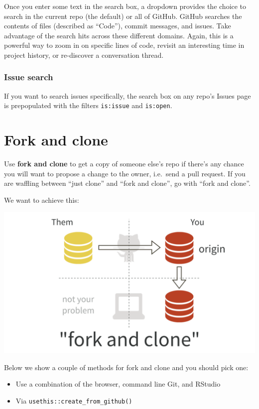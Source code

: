 \documentclass[
]{book}
\providecommand{\tightlist}{%
  \setlength{\itemsep}{0pt}\setlength{\parskip}{0pt}}
\begin{document}
Once you enter some text in the search box, a dropdown provides the choice to search in the current repo (the default) or all of GitHub. GitHub searches the contents of files (described as ``Code''), commit messages, and issues. Take advantage of the search hits across these different domains. Again, this is a powerful way to zoom in on specific lines of code, revisit an interesting time in project history, or re-discover a conversation thread.

\subsection{Issue search}\label{issue-search}

If you want to search issues specifically, the search box on any repo's Issues page is prepopulated with the filters \texttt{is:issue} and \texttt{is:open}.

\chapter{Fork and clone}\label{fork-and-clone}

Use \textbf{fork and clone} to get a copy of someone else's repo if there's any chance you will want to propose a change to the owner, i.e.~send a pull request.
If you are waffling between ``just clone'' and ``fork and clone'', go with ``fork and clone''.

We want to achieve this:

\begin{center}\includegraphics[width=0.6\linewidth]{img/fork-and-clone} \end{center}

Below we show a couple of methods for fork and clone and you should pick one:

\begin{itemize}
\tightlist
\item
  Use a combination of the browser, command line Git, and RStudio
\item
  Via \texttt{usethis::create\_from\_github()}
\end{itemize}
\end{document}
